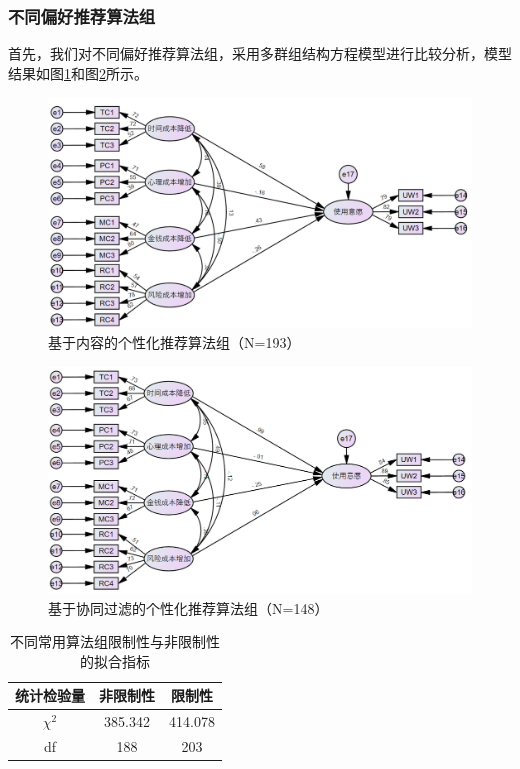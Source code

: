 \documentclass[12pt,UTF8]{ctexart}
\begin{document}
\begin{spacing}{1.25}
\subsubsection{不同偏好推荐算法组}
首先，我们对不同偏好推荐算法组，采用多群组结构方程模型进行比较分析，模型结果如图\ref{fig:nr}和图\ref{fig:xt}所示。
\begin{figure}[H]
\centering
\includegraphics[scale = .5]{nr.png}
\caption{基于内容的个性化推荐算法组（N=193）}
\label{fig:nr}
\end{figure}
\begin{figure}[H]
\centering
\includegraphics[scale = .5]{xt.png}
\caption{基于协同过滤的个性化推荐算法组（N=148）}
\label{fig:xt}
\end{figure}
\begin{table}[H]
\centering
\caption{不同常用算法组限制性与非限制性的拟合指标}
\label{tab:constrain1}
\begin{tabular}{@{}ccc@{}}
\toprule
\textbf{统计检验量} & \textbf{非限制性} & \textbf{限制性} \\ \midrule
$\chi^{2}$     & 385.342       & 414.078      \\
df             & 188           & 203          \\

\end{tabular}
\end{table}
\end{spacing}
\end{document}

